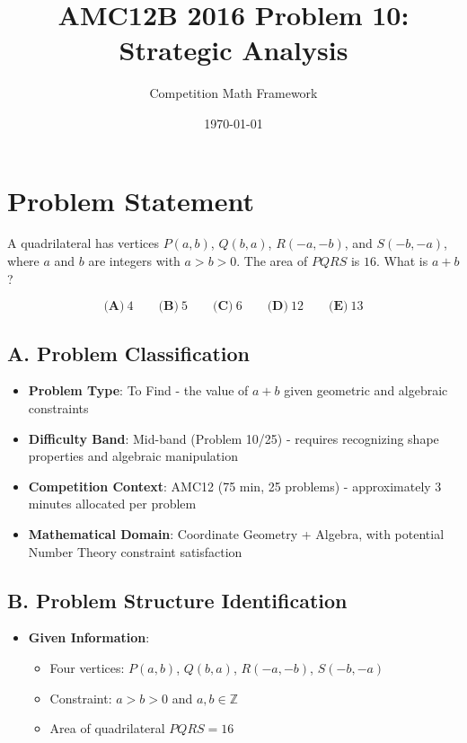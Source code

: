 \documentclass[]{article}
\begin{document}
\title{AMC12B 2016 Problem 10: Strategic Analysis}
\author{Competition Math Framework}
\date{\today}
\maketitle

\section*{Problem Statement}
A quadrilateral has vertices $P(a,b)$, $Q(b,a)$, $R(-a, -b)$, and $S(-b, -a)$, where $a$ and $b$ are integers with $a>b>0$. The area of $PQRS$ is $16$. What is $a+b$?

$$\textbf{(A)}\ 4 \qquad\textbf{(B)}\ 5 \qquad\textbf{(C)}\ 6 \qquad\textbf{(D)}\ 12 \qquad\textbf{(E)}\ 13$$

\begin{problemconfigbox}
\subsection*{A. Problem Classification}
\begin{itemize}[leftmargin=*]
    \item \textbf{Problem Type}: To Find - the value of $a+b$ given geometric and algebraic constraints
    \item \textbf{Difficulty Band}: Mid-band (Problem 10/25) - requires recognizing shape properties and algebraic manipulation
    \item \textbf{Competition Context}: AMC12 (75 min, 25 problems) - approximately 3 minutes allocated per problem
    \item \textbf{Mathematical Domain}: Coordinate Geometry + Algebra, with potential Number Theory constraint satisfaction
\end{itemize}

\subsection*{B. Problem Structure Identification}
\begin{itemize}[leftmargin=*]
    \item \textbf{Given Information}: 
    \begin{itemize}
        \item Four vertices: $P(a,b)$, $Q(b,a)$, $R(-a,-b)$, $S(-b,-a)$
        \item Constraint: $a > b > 0$ and $a,b \in \mathbb{Z}$
        \item Area of quadrilateral $PQRS = 16$
    \end{itemize}
    

\end{itemize}
\end{problemconfigbox}
\end{document}
